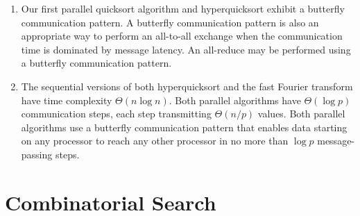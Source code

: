 \begin{enumerate}
\addtocounter{enumi}{3}

\item Our first parallel quicksort algorithm and hyperquicksort
      exhibit a butterfly communication pattern.
      A butterfly communication pattern is also an appropriate way to perform an
      all-to-all exchange when the communication time is dominated by message
      latency.
      An all-reduce may be performed using a butterfly communication pattern.

\item The sequential versions of both hyperquicksort and the fast Fourier
      transform have time complexity $\Theta(n\log n)$.
      Both parallel algorithms have $\Theta(\log p)$ communication steps,
      each step transmitting $\Theta(n/p)$ values.
      Both parallel algorithms use a butterfly communication pattern that
      enables data starting on any processor to reach any other processor in
      no more than $\log p$ message-passing steps.

\end{enumerate}

\chapter{Combinatorial Search}


